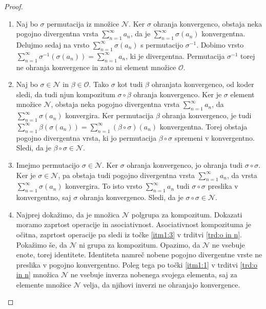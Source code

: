 \documentclass[12pt,a4paper,reqno]{amsart}
\theoremstyle{definition} %
\theoremstyle{plain} %
\begin{document}
\begin{proof}
\begin{enumerate}
\item Naj bo $\sigma$ permutacija iz množice $\mathcal{N}$. Ker $\sigma$ ohranja konvergenco, obstaja neka pogojno divergentna vrsta $\sum_{n=1}^{\infty}a_n$, da je $\sum_{n=1}^{\infty}\sigma(a_n)$ konvergentna. Delujmo sedaj na vrsto  $\sum_{n=1}^{\infty}\sigma(a_n)$ s permutacijo $\sigma^{-1}$. Dobimo vrsto $\sum_{n=1}^{\infty}\sigma^{-1}(\sigma(a_n))=\sum_{n=1}^{\infty}a_n$, ki je divergentna. Permutacija $\sigma^{-1}$ torej ne ohranja konvergence in zato ni element množice $\mathcal{O}$.

\item Naj bo $\sigma \in \mathcal{N}$ in $\beta \in \mathcal{O}$. Tako $\sigma$ kot tudi $\beta$ ohranjata konvergenco, od koder sledi, da tudi njun kompozitum $\sigma \circ \beta$ ohranja konvergenco. Ker je $\sigma$ element množice $\mathcal{N}$, obstaja neka pogojno divergentna vrsta $\sum_{n=1}^{\infty}a_n$, da $\sum_{n=1}^{\infty}\sigma(a_n)$ konvergira. Ker permutacija $\beta$ ohranja konvergenco, je tudi $\sum_{n=1}^{\infty}\beta(\sigma(a_n))=\sum_{n=1}^{\infty}(\beta \circ \sigma)(a_n)$ konvergentna. Torej obstaja pogojno divergentna vrsta, ki jo permutacija $\beta \circ \sigma$ spremeni v konvergentno. Sledi, da je $\beta \circ \sigma \in \mathcal{N}$.

\item Imejmo permutacijo $\sigma \in \mathcal{N}$. Ker $\sigma$ ohranja konvergenco, jo ohranja tudi $\sigma \circ \sigma$. Ker je $\sigma \in \mathcal{N}$, pa obstaja tudi pogojno divergentna vrsta $\sum_{n=1}^{\infty}a_n$, da vrsta $\sum_{n=1}^{\infty}\sigma(a_n)$ konvergira. To isto vrsto $\sum_{n=1}^{\infty}a_n$ tudi $\sigma \circ \sigma$ preslika v konvergentno, saj $\sigma$ ohranja konvergenco. Sledi, da je $\sigma \circ \sigma \in \mathcal{N}$.

\item Najprej dokažimo, da je množica $\mathcal{N}$ polgrupa za kompozitum. Dokazati moramo zaprtost operacije in asociativnost. Asociativnost kompozituma je očitna, zaprtost operacije pa sledi iz točke \ref{itm1:3} v trditvi \ref{trd:o in n}. Pokažimo še, da $\mathcal{N}$ ni grupa za kompozitum. Opazimo, da $\mathcal{N}$ ne vsebuje enote, torej identitete. Identiteta namreč nobene pogojno divergentne vrste ne preslika v pogojno konvergentno. Poleg tega po točki \ref{itm1:1} v trditvi \ref{trd:o in n} množica $\mathcal{N}$ ne vsebuje inverza nobenega svojega elementa, saj za elemente množice $\mathcal{N}$ velja, da njihovi inverzi ne ohranjajo konvergence.
\end{enumerate}
\end{proof}
\end{document}

